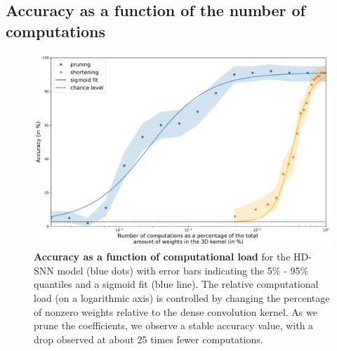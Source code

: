 \documentclass[landscape,a0]{a0poster}
\newcommand{\colorsec}{red}
\newcommand{\colorsubsec}{gray}
\begin{document}
\begin{multicols}{3}
\subsection*{\color{\colorsubsec}Accuracy as a function of the number of computations}
\begin{figure}[H]
    \centering
    \includegraphics[width=0.6\linewidth]{figures/quant_accuracy.pdf}
    \caption{\textbf{Accuracy as a function of computational load} for the HD-SNN model (blue dots) with error bars indicating the 5\% - 95\% quantiles and a sigmoid fit (blue line). The relative computational load (on a logarithmic axis) is controlled by changing the percentage of nonzero weights relative to the dense convolution kernel. As we prune the coefficients, we observe a stable accuracy value, with a drop observed at about 25 times fewer computations.}
    \label{fig:accuracy}
\end{figure}
%
%

\end{multicols}
\end{document}

